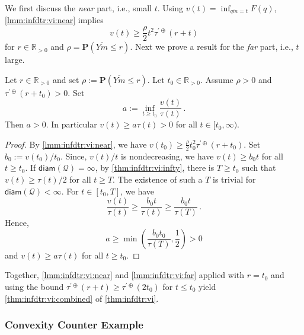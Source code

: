 \documentclass{article}
\newcommand*{\mc}[1]{\mathcal{#1}}
\newcommand{\R}{\mathbb{R}}
\newcommand{\Rpp}{\R_{>0}}
\newcommand{\lb}{\left(} %
\newcommand{\rb}{\right)} %
\newcommand{\br}[1]{\lb #1 \rb} %
\newcommand{\brOf}[1]{\!\br{#1}} %
\renewcommand{\Pr}{\mathbf{P}} %
\newcommand{\Prof}[1]{\Pr(#1)}
\newcommand{\eqfs}{\,.}
\newcommand{\ol}[2]{\overline{#1#2}}
\newcommand{\tran}{\tau}
\newcommand{\ddrtran}{\tau^{\prime\oplus}}
\newcommand{\diam}{\mathsf{diam}}
\begin{document}
We first discuss the \emph{near} part, i.e., small $t$. Using $v(t) = \inf_{\ol qm = t} F(q)$, \cref{lmm:infdtr:vi:near} implies
\begin{equation}
    v(t) \geq \frac\rho2 t^2 \ddrtran\brOf{r + t}
\end{equation}
for $r\in\Rpp$ and $\rho =\Prof{\ol Ym\leq r}$.
%
Next we prove a result for the \emph{far} part, i.e., $t$ large.
%
\begin{lemma}\label{lmm:infdtr:vi:far}
    Let $r\in\Rpp$ and set $\rho := \Prof{\ol Ym\leq r}$. 
    Let $t_0\in\Rpp$.
    Assume $\rho > 0$ and $\ddrtran(r+t_0) > 0$. Set
    \begin{equation}
        a := \inf_{t\geq t_0}\frac{v(t)}{\tran(t)}
        \eqfs
    \end{equation}
    Then $a>0$. In particular $v(t) \geq a \tran(t) > 0$ for all $t\in [t_0, \infty)$.
\end{lemma}
%
\begin{proof}
    By \cref{lmm:infdtr:vi:near}, we have $v(t_0) \geq \frac{\rho}2 t_0^2 \ddrtran(r+t_0)$. Set $b_0 := v(t_0)/t_0$.
    Since, $v(t)/t$ is nondecreasing, we have $v(t) \geq b_0 t$ for all $t\geq t_0$.
    If $\diam(\mc Q) = \infty$, by \ref{thm:infdtr:vi:infty}, there is $T \geq t_0$ such that $v(t) \geq \tran(t)/2$ for all $t\geq T$. The existence of such a $T$ is trivial for $\diam(\mc Q) < \infty$.
    For $t\in [t_0, T]$, we have
    \begin{equation}
        \frac{v(t)}{\tran(t)} \geq \frac{b_0 t}{\tran(t)} \geq \frac{b_0 t}{\tran(T)}
        \eqfs
    \end{equation}
    Hence,
    \begin{equation}
        a \geq \min\brOf{\frac{b_0 t_0}{\tran(T)}, \frac12} > 0
    \end{equation}
    and $v(t) \geq a\tran(t)$ for all $t\geq t_0$.
\end{proof}

Together, \cref{lmm:infdtr:vi:near} and \cref{lmm:infdtr:vi:far} applied with $r = t_0$ and using the bound $\ddrtran(r+t) \geq \ddrtran(2t_0)$ for $t \leq t_0$ yield \ref{thm:infdtr:vi:combined} of \cref{thm:infdtr:vi}.


\subsubsection{Convexity Counter Example}
\end{document}
